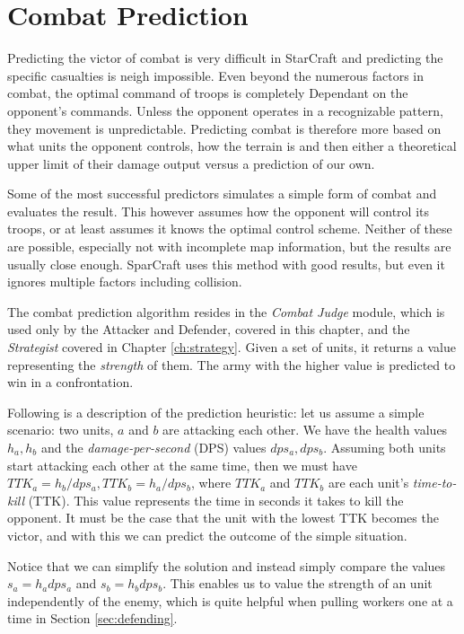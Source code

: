 \section{Combat Prediction}
Predicting the victor of combat is very difficult in StarCraft and predicting the specific casualties is neigh impossible. Even beyond the numerous factors in combat, the optimal command of troops is completely Dependant on the opponent's commands. Unless the opponent operates in a recognizable pattern, they movement is unpredictable. Predicting combat is therefore more based on what units the opponent controls, how the terrain is and then either a theoretical upper limit of their damage output versus a prediction of our own.

Some of the most successful predictors simulates a simple form of combat and evaluates the result. This however assumes how the opponent will control its troops, or at least assumes it knows the optimal control scheme. Neither of these are possible, especially not with incomplete map information, but the results are usually close enough. SparCraft uses this method with good results, but even it ignores multiple factors including collision.

The combat prediction algorithm resides in the \emph{Combat Judge} module, which is used only by the Attacker and Defender, covered in this chapter, and the \emph{Strategist} covered in Chapter \ref{ch:strategy}. Given a set of units, it returns a value representing the \emph{strength} of them. The army with the higher value is predicted to win in a confrontation.

Following is a description of the prediction heuristic: let us assume a simple scenario: two units, $a$ and $b$ are attacking each other. We have the health values $h_a, h_b$ and the \emph{damage-per-second} (DPS) values $dps_a, dps_b$. Assuming both units start attacking each other at the same time, then we must have $TTK_a = h_b / dps_a, TTK_b = h_a / dps_b$, where $TTK_a$ and $TTK_b$ are each unit's \emph{time-to-kill} (TTK). This value represents the time in seconds it takes to kill the opponent. It must be the case that the unit with the lowest TTK becomes the victor, and with this we can predict the outcome of the simple situation.

Notice that we can simplify the solution and instead simply compare the values $s_a = h_a dps_a$ and $s_b = h_b dps_b$. This enables us to value the strength of an unit independently of the enemy, which is quite helpful when pulling workers one at a time in Section \ref{sec:defending}.

